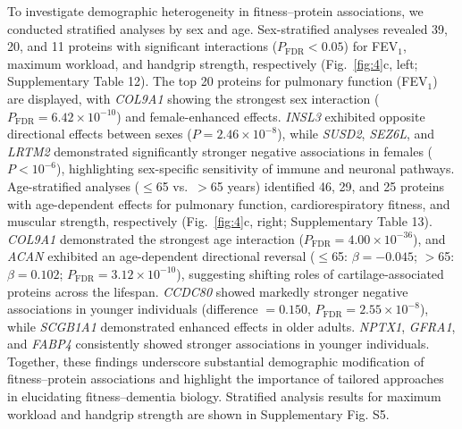 \documentclass{article}
\begin{document}
To investigate demographic heterogeneity in fitness–protein associations, we conducted stratified analyses by sex and age. Sex-stratified analyses revealed 39, 20, and 11 proteins with significant interactions ($P_{\text{FDR}} < 0.05$) for FEV$_1$, maximum workload, and handgrip strength, respectively (Fig.~\ref{fig:4}c, left; Supplementary Table 12). The top 20 proteins for pulmonary function (FEV$_1$) are displayed, with \textit{COL9A1} showing the strongest sex interaction ($P_{\text{FDR}} = 6.42 \times 10^{-10}$) and female-enhanced effects. \textit{INSL3} exhibited opposite directional effects between sexes ($P = 2.46 \times 10^{-8}$), while \textit{SUSD2}, \textit{SEZ6L}, and \textit{LRTM2} demonstrated significantly stronger negative associations in females ($P < 10^{-6}$), highlighting sex-specific sensitivity of immune and neuronal pathways. Age-stratified analyses ($\leq$65 vs.\ $>$65 years) identified 46, 29, and 25 proteins with age-dependent effects for pulmonary function, cardiorespiratory fitness, and muscular strength, respectively (Fig.~\ref{fig:4}c, right; Supplementary Table 13). \textit{COL9A1} demonstrated the strongest age interaction ($P_{\text{FDR}} = 4.00 \times 10^{-36}$), and \textit{ACAN} exhibited an age-dependent directional reversal ($\leq$65: $\beta = -0.045$; $>$65: $\beta = 0.102$; $P_{\text{FDR}} = 3.12 \times 10^{-10}$), suggesting shifting roles of cartilage-associated proteins across the lifespan. \textit{CCDC80} showed markedly stronger negative associations in younger individuals (difference $= 0.150$, $P_{\text{FDR}} = 2.55 \times 10^{-8}$), while \textit{SCGB1A1} demonstrated enhanced effects in older adults. \textit{NPTX1}, \textit{GFRA1}, and \textit{FABP4} consistently showed stronger associations in younger individuals. Together, these findings underscore substantial demographic modification of fitness–protein associations and highlight the importance of tailored approaches in elucidating fitness–dementia biology. Stratified analysis results for maximum workload and handgrip strength are shown in Supplementary Fig. S5.
\end{document}
